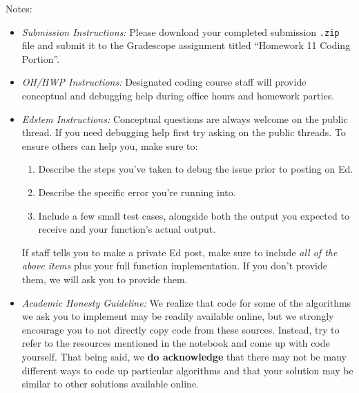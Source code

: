 \documentclass[11pt]{article}
\begin{document}
\noindent Notes:
\begin{itemize}
    \item \textit{Submission Instructions:} Please download your completed submission \texttt{.zip} file and submit it to the Gradescope assignment titled ``Homework 11 Coding Portion''. 
        
    \item \textit{OH/HWP Instructions:} Designated coding course staff will provide conceptual and debugging help during office hours and homework parties.

    \item \textit{Edstem Instructions:} Conceptual questions are always welcome on the public thread. If you need debugging help first try asking on the public threads. To ensure others can help you, make sure to:
        \begin{enumerate}
            \item Describe the steps you've taken to debug the issue prior to posting on Ed.
            \item Describe the specific error you're running into.
            \item Include a few small test cases, alongside both the output you expected to receive and your function's actual output. 
        \end{enumerate}
    If staff tells you to make a private Ed post, make sure to include \textit{all of the above items} plus your full function implementation. If you don't provide them, we will ask you to provide them.
    
    \item \textit{Academic Honesty Guideline:} We realize that code for some of the algorithms we ask you to implement may be readily available online, but we strongly encourage you to not directly copy code from these sources. Instead, try to refer to the resources mentioned in the notebook and come up with code yourself. That being said, we \textbf{do acknowledge} that there may not be many different ways to code up particular algorithms and that your solution may be similar to other solutions available online.
    
\end{itemize}
\end{document}
